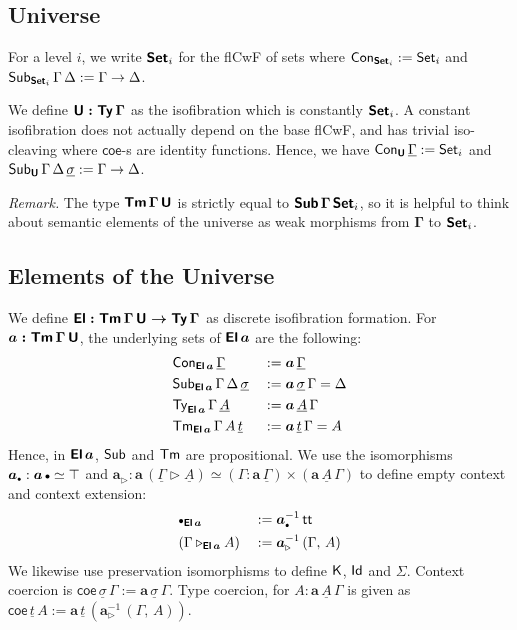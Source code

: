 \documentclass[sigplan,review,anonymous]{acmart}\settopmatter{printfolios=true,printccs=false,printacmref=false}
\newcommand{\ext}{\triangleright}
\newcommand{\emptycon}{\scaleobj{.75}\bullet}
\newcommand{\bSub}{\boldsymbol{\Sub}}
\newcommand{\bTm}{\boldsymbol{\Tm}}
\newcommand{\bGamma}{\boldsymbol{\Gamma}}
\newcommand{\ba}{\boldsymbol{a}}
\newcommand{\bSet}{\boldsymbol{\Set}}
\newcommand{\bU}{\boldsymbol{\U}}
\newcommand{\bEl}{\boldsymbol{\El}}
\newcommand{\ul}[1]{\underline{#1}}
\newcommand{\ulGamma}{\ul{\Gamma}}
\newcommand{\ulsigma}{\ul{\sigma}}
\newcommand{\ult}{\ul{t}}
\newcommand{\ulA}{\ul{A}}
\newcommand{\coe}{\mathsf{coe}}
\begin{document}
\subsection{Universe}
\label{sec:universe}

\begin{definition} For a level $i$, we write $\bSet_i$ for the flCwF of sets where $\Con_{\bSet_i} := \Set_i$ and $\Sub_{\bSet_i}\,\Gamma\,\Delta := \Gamma \ra \Delta$.
\end{definition}

We define $\boldsymbol{\mathsf{U} : \mathsf{Ty}\,\Gamma}$ as the isofibration which is
constantly $\bSet_i$. A constant isofibration does not actually depend on the
base flCwF, and has trivial iso-cleaving where $\coe$-s are identity
functions. Hence, we have $\Con_{\bU}\,\ulGamma := \Set_i$ and
$\Sub_{\bU}\,\Gamma\,\Delta\,\ulsigma := \Gamma \ra \Delta$.

\emph{Remark.} The type $\bTm\,\bGamma\,\bU$ is strictly equal to
$\bSub\,\bGamma\,\bSet_i$, so it is helpful to think about semantic elements of
the universe as weak morphisms from $\bGamma$ to $\bSet_i$.

\subsection{Elements of the Universe}

We define $\boldsymbol{\mathsf{El} : \mathsf{Tm}\,\Gamma\,\mathsf{U} \rightarrow \mathsf{Ty}\,\Gamma}$ as discrete
isofibration formation. For $\boldsymbol{a : \mathsf{Tm}\,\Gamma\,\mathsf{U}}$, the underlying
sets of $\bEl\,\ba$ are the following:
\begin{alignat*}{3}
  & \Con_{\bEl\,\ba}\,\ulGamma && := \ba\,\ulGamma\\
  & \Sub_{\bEl\,\ba}\,\Gamma\,\Delta\,\ulsigma && := \ba\,\ulsigma\,\Gamma = \Delta\\
  & \Ty_{\bEl\,\ba}\,\Gamma\,\ulA && := \ba\,\ulA\,\Gamma\\
  & \Tm_{\bEl\,\ba}\,\Gamma\,A\,\ult && := \ba\,\ult\,\Gamma = A
\end{alignat*}
Hence, in $\bEl\,\ba$, $\mathsf{Sub}$ and $\mathsf{Tm}$ are propositional. We use the
isomorphisms $\ba_{\emptycon} : \ba\,\emptycon \simeq \top$ and $\ba_{\ext} :
\ba\,(\ulGamma\ext\ulA) \simeq (\Gamma :
\ba\,\ulGamma)\times(\ba\,\ulA\,\Gamma)$ to define empty context and context
extension:
\begin{alignat*}{3}
  & \emptycon_{\bEl\,\ba} && := \ba_{\emptycon}^{-1}\,\tt\\
  & (\Gamma\ext_{\bEl\,\ba} A) && := \ba_{\ext}^{-1}\,(\Gamma,\,A)
\end{alignat*}
We likewise use preservation isomorphisms to define $\mathsf{K}$, $\mathsf{Id}$ and $\Sigma$.
Context coercion is $\coe\,\ulsigma\,\Gamma := \ba\,\ulsigma\,\Gamma$. Type coercion, for $A : \ba\,\ulA\,\Gamma$ is given as $\coe\,\ult\,A := \ba\,\ult\,(\ba_{\ext}^{-1}\,(\Gamma,\,A))$.
\end{document}
